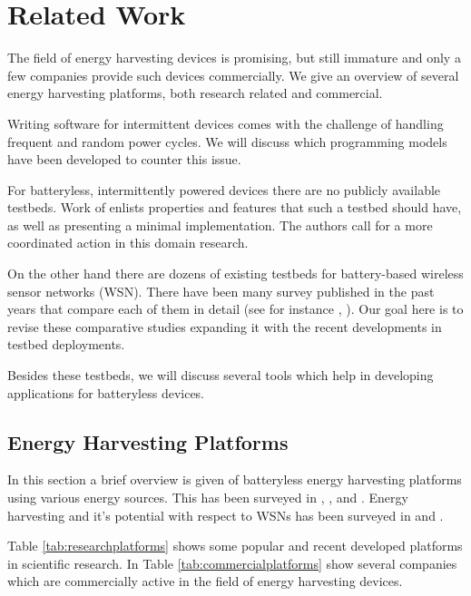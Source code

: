 \chapter{Related Work}
\label{chp:related-work}

The field of energy harvesting devices is promising, but still immature and only a few companies provide such devices commercially. We give an overview of several energy harvesting platforms, both research related and commercial.

Writing software for intermittent devices comes with the challenge of handling frequent and random power cycles. We will discuss which programming models have been developed to counter this issue.

For batteryless, intermittently powered devices there are no publicly available testbeds. Work of \cite{request} enlists properties and features that such a testbed should have, as well as presenting a minimal implementation. The authors call for a more coordinated action in this domain research.

On the other hand there are dozens of existing testbeds for battery-based wireless sensor networks (WSN). There have been many survey published in the past years that compare each of them in detail (see for instance \cite{survey1}, \cite{survey2}). Our goal here is to revise these comparative studies expanding it with the recent developments in testbed deployments.

Besides these testbeds, we will discuss several tools which help in developing applications for batteryless devices.

\section{Energy Harvesting Platforms}

In this section a brief overview is given of batteryless energy harvesting platforms using various energy sources. This has been surveyed in \cite{sudevalayam2011energy}, \cite{energywsn} ,\cite{talla2015powering} and \cite{kim2014ambient}. Energy harvesting and it's potential with respect to WSNs has been surveyed in \cite{akhtar2015energy} and \cite{bhatti2016energy}.

Table \ref{tab:researchplatforms} shows some popular and recent developed platforms in scientific research. In Table \ref{tab:commercialplatforms} show several companies which are commercially active in the field of energy harvesting devices.

